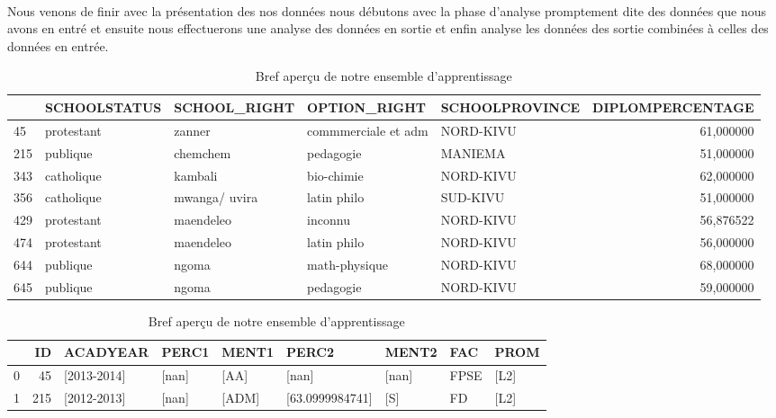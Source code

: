 \paragraph{}
Nous venons de finir avec la présentation des nos données nous débutons avec la phase d'analyse promptement dite  des données que nous avons en entré et ensuite nous effectuerons  une analyse des données en
sortie et enfin analyse les données des sortie combinées à celles des données  en entrée.
\begin{table}
	\centering
	\begingroup %
	\captionsetup{type=table} %
	\caption{Bref aperçu de notre ensemble d'apprentissage }
	\label{tab:Dataset}
	\begin{tabular}{lllllr}
		\toprule
		{} & SCHOOLSTATUS &   SCHOOL\_RIGHT &         OPTION\_RIGHT & SCHOOLPROVINCE &  DIPLOMPERCENTAGE \\
		\midrule
		45  &   protestant &         zanner &  commmerciale et adm &      NORD-KIVU &         61,000000 \\
		215 &     publique &       chemchem &            pedagogie &        MANIEMA &         51,000000 \\
		343 &   catholique &        kambali &           bio-chimie &      NORD-KIVU &         62,000000 \\
		356 &   catholique &  mwanga/ uvira &          latin philo &       SUD-KIVU &         51,000000 \\
		429 &   protestant &      maendeleo &              inconnu &      NORD-KIVU &         56,876522 \\
		474 &   protestant &      maendeleo &          latin philo &      NORD-KIVU &         56,000000 \\
		644 &     publique &          ngoma &        math-physique &      NORD-KIVU &         68,000000 \\
		645 &     publique &          ngoma &            pedagogie &      NORD-KIVU &         59,000000 \\
		\bottomrule
	\end{tabular}
	\begin{tabular}{lrlllllll}
	\toprule
	{} &   ID &                ACADYEAR &                  PERC1 &     MENT1 &                 PERC2 &       MENT2 &   FAC &      PROM \\
	\midrule
	0 &   45 &             [2013-2014] &                  [nan] &      [AA] &                 [nan] &       [nan] &  FPSE &      [L2] \\
	1 &  215 &             [2012-2013] &                  [nan] &     [ADM] &       [63.0999984741] &         [S] &    FD &      [L2] \\

\end{tabular}
\end{table}
